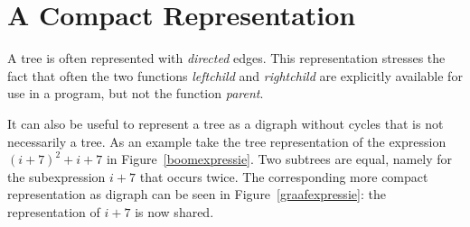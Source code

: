 \section{A Compact Representation}

A tree is often represented with {\em directed} edges. This
representation stresses the fact that often the two functions {\em
leftchild} and {\em rightchild} are explicitly available for use in a
program, but not the function {\em parent}.

It can also be useful to represent a tree as a digraph without cycles
that is not necessarily a tree. As an example take the tree
representation of the expression $(i+7)^{2} + i + 7$ in
Figure~\ref{boomexpressie}. Two subtrees are equal, namely for the
subexpression $i+7$ that occurs twice. The corresponding more compact
representation as digraph can be seen in Figure~\ref{graafexpressie}:
the representation of $i+7$ is now shared.

